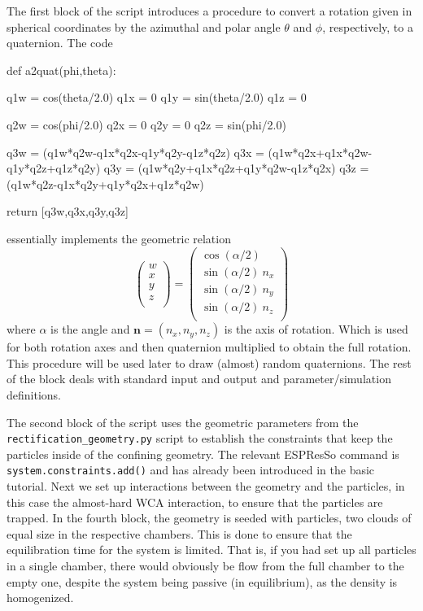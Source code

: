 \documentclass[aip,jcp,reprint,a4paper,onecolumn,amsmath]{revtex4-1}
\newcommand\code{\lstinline}
\newcommand{\es}{\mbox{\textsf{ESPResSo}}\xspace}
\newcommand\codees{\lstinline[language=python]}
\begin{document}
The first block of the script introduces a procedure to convert a rotation given in spherical coordinates by the azimuthal and polar angle $\theta$ and $\phi$, respectively, to a quaternion. The code
\begin{espresso}
def a2quat(phi,theta):

    q1w = cos(theta/2.0)
    q1x = 0
    q1y = sin(theta/2.0)
    q1z = 0

    q2w = cos(phi/2.0)
    q2x = 0
    q2y = 0
    q2z = sin(phi/2.0)

    q3w = (q1w*q2w-q1x*q2x-q1y*q2y-q1z*q2z)
    q3x = (q1w*q2x+q1x*q2w-q1y*q2z+q1z*q2y)
    q3y = (q1w*q2y+q1x*q2z+q1y*q2w-q1z*q2x)
    q3z = (q1w*q2z-q1x*q2y+q1y*q2x+q1z*q2w)

    return [q3w,q3x,q3y,q3z]
\end{espresso}
essentially implements the geometric relation
\begin{equation}
  \begin{pmatrix}
    w \\ x \\ y \\ z \\
  \end{pmatrix}
  =
  \begin{pmatrix}
    \cos(\alpha/2) \\
    \sin(\alpha/2)\ n_x \\
    \sin(\alpha/2)\ n_y \\
    \sin(\alpha/2)\ n_z \\
  \end{pmatrix}
\end{equation}
where $\alpha$ is the angle and $\mathbf{n} = (n_x,n_y,n_z)$ is the
axis of rotation. Which is used for both rotation axes and then quaternion multiplied to obtain the full rotation. This procedure will be used later to draw (almost) random quaternions. The rest of the block deals with standard input and output and parameter/simulation definitions.

The second block of the script uses the geometric parameters from the \code{rectification_geometry.py} script to establish the constraints that keep the particles inside of the confining geometry. The relevant \es{} command is \codees{system.constraints.add()} and has already been introduced in the basic tutorial. Next we set up interactions between the geometry and the particles, in this case the almost-hard WCA interaction, to ensure that the particles are trapped. In the fourth block, the geometry is seeded with particles, two clouds of equal size in the respective chambers. This is done to ensure that the equilibration time for the system is limited. That is, if you had set up all particles in a single chamber, there would obviously be flow from the full chamber to the empty one, despite the system being passive (in equilibrium), as the density is homogenized.
\end{document}
